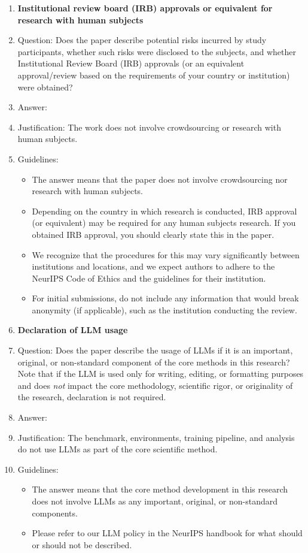 \documentclass{article}
\begin{document}
\begin{enumerate}
\item {\bf Institutional review board (IRB) approvals or equivalent for research with human subjects}
    \item[] Question: Does the paper describe potential risks incurred by study participants, whether such risks were disclosed to the subjects, and whether Institutional Review Board (IRB) approvals (or an equivalent approval/review based on the requirements of your country or institution) were obtained?
    \item[] Answer: \answerNA{}
    \item[] Justification: The work does not involve crowdsourcing or research with human subjects.
    \item[] Guidelines:
    \begin{itemize}
        \item The answer \answerNA{} means that the paper does not involve crowdsourcing nor research with human subjects.
        \item Depending on the country in which research is conducted, IRB approval (or equivalent) may be required for any human subjects research. If you obtained IRB approval, you should clearly state this in the paper.
        \item We recognize that the procedures for this may vary significantly between institutions and locations, and we expect authors to adhere to the NeurIPS Code of Ethics and the guidelines for their institution.
        \item For initial submissions, do not include any information that would break anonymity (if applicable), such as the institution conducting the review.
    \end{itemize}

\item {\bf Declaration of LLM usage}
    \item[] Question: Does the paper describe the usage of LLMs if it is an important, original, or non-standard component of the core methods in this research? Note that if the LLM is used only for writing, editing, or formatting purposes and does \emph{not} impact the core methodology, scientific rigor, or originality of the research, declaration is not required.
    \item[] Answer: \answerNA{}
    \item[] Justification: The benchmark, environments, training pipeline, and analysis do not use LLMs as part of the core scientific method.
    \item[] Guidelines:
    \begin{itemize}
        \item The answer \answerNA{} means that the core method development in this research does not involve LLMs as any important, original, or non-standard components.
        \item Please refer to our LLM policy in the NeurIPS handbook for what should or should not be described.
    \end{itemize}

\end{enumerate}
\end{document}
